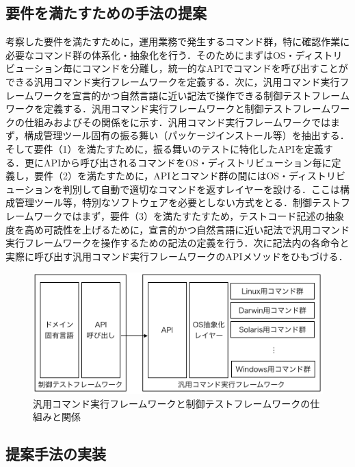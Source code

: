 \subsection{要件を満たすための手法の提案}

考察した要件を満たすために，運用業務で発生するコマンド群，特に確認作業に必要なコマンド群の体系化・抽象化を行う．そのためにまずはOS・ディストリビューション毎にコマンドを分離し，統一的なAPIでコマンドを呼び出すことができる汎用コマンド実行フレームワークを定義する．次に，汎用コマンド実行フレームワークを宣言的かつ自然言語に近い記法で操作できる制御テストフレームワークを定義する．汎用コマンド実行フレームワークと制御テストフレームワークの仕組みおよびその関係をに示す．汎用コマンド実行フレームワークではまず，構成管理ツール固有の振る舞い（パッケージインストール等）を抽出する．そして要件（1）を満たすために，振る舞いのテストに特化したAPIを定義する．更にAPIから呼び出されるコマンドをOS・ディストリビューション毎に定義し，要件（2）を満たすために，APIとコマンド群の間にはOS・ディストリビューションを判別して自動で適切なコマンドを返すレイヤーを設ける．ここは構成管理ツール等，特別なソフトウェアを必要としない方式をとる．制御テストフレームワークではまず，要件（3）を満たすたすため，テストコード記述の抽象度を高め可読性を上げるために，宣言的かつ自然言語に近い記法で汎用コマンド実行フレームワークを操作するための記法の定義を行う．次に記法内の各命令と実際に呼び出す汎用コマンド実行フレームワークのAPIメソッドをひもづける．



\begin{figure}[tb]
  \includegraphics{framework-overview.png}
  \caption{汎用コマンド実行フレームワークと制御テストフレームワークの仕組みと関係}
  \label{fig:framework}
\end{figure}

\subsection{提案手法の実装}

